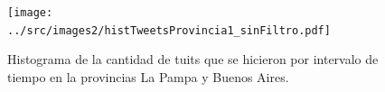 \begin{frame}[c]
\begin{columns}
    \end{columns}


  \begin{figure}
    \begin{columns}%
        \begin{column}{0.65\textwidth}%
            \texttt{[image: ../src/images2/histTweetsProvincia1\_sinFiltro.pdf]}
        \end{column}%
        \begin{column}{0.33\textwidth}%
            \caption{Histograma de la cantidad de tuits que se hicieron por intervalo de tiempo en la provincias La Pampa y Buenos Aires.}
        \end{column}%
    \end{columns}
\end{figure}

\end{frame}

